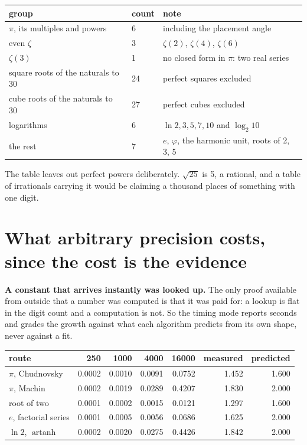 \begin{center}
\begin{tabular}{@{}llp{6.5cm}@{}}
\toprule
group & count & note \\
\midrule
\(\pi\), its multiples and powers & 6 & including the placement angle \\
even \(\zeta\) & 3 & \(\zeta(2)\), \(\zeta(4)\), \(\zeta(6)\) \\
\(\zeta(3)\) & 1 & no closed form in \(\pi\): two real series \\
square roots of the naturals to 30 & 24 & perfect squares excluded \\
cube roots of the naturals to 30 & 27 & perfect cubes excluded \\
logarithms & 6 & \(\ln 2,3,5,7,10\) and \(\log_2 10\) \\
the rest & 7 & \(e\), \(\varphi\), the harmonic unit, roots of 2, 3, 5 \\
\bottomrule
\end{tabular}
\end{center}

The table leaves out perfect powers deliberately. \(\sqrt{25}\) is 5, a rational, and a table of irrationals
carrying it would be claiming a thousand places of something with one digit.

\section{What arbitrary precision costs, since the cost is the evidence}

\textbf{A constant that arrives instantly was looked up.} The only proof available from outside that
a number was computed is that it was paid for: a lookup is flat in the digit count and a computation
is not. So the timing mode reports seconds and grades the growth against what each algorithm
predicts from its own shape, never against a fit.

\begin{center}
\begin{tabular}{@{}lrrrrrr@{}}
\toprule
route & 250 & 1000 & 4000 & 16000 & measured & predicted \\
\midrule
\(\pi\), Chudnovsky & 0.0002 & 0.0010 & 0.0091 & 0.0752 & 1.452 & 1.600 \\
\(\pi\), Machin & 0.0002 & 0.0019 & 0.0289 & 0.4207 & 1.830 & 2.000 \\
root of two & 0.0001 & 0.0002 & 0.0015 & 0.0121 & 1.297 & 1.600 \\
\(e\), factorial series & 0.0001 & 0.0005 & 0.0056 & 0.0686 & 1.625 & 2.000 \\
\(\ln 2\), \(\operatorname{artanh}\) & 0.0002 & 0.0020 & 0.0275 & 0.4426 & 1.842 & 2.000 \\
\bottomrule
\end{tabular}
\end{center}

